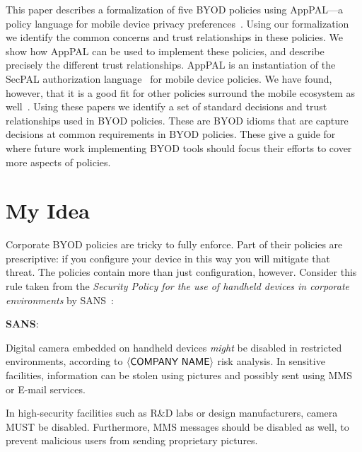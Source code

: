 \documentclass{easychair}
\newenvironment{policyrule}[1]{%
  \begin{mdframed}\footnotesize
      \noindent\textbf{\sffamily #1}:~\itshape%
}{%
  \end{mdframed}
}
\begin{document}
This paper describes a formalization of five BYOD policies using AppPAL---a policy language for mobile device privacy preferences~\cite{hallett_apppal_2016}.
Using our formalization we identify the common concerns and trust relationships in these policies.
We show how AppPAL can be used to implement these policies, and describe precisely the different trust relationships.
AppPAL is an instantiation of the SecPAL authorization language~\cite{becker_secpal:_2010} for mobile device policies.
We have found, however, that it is a good fit for other policies surround the mobile ecosystem as well~\cite{hallett_specifying_2016}.
Using these papers we identify a set of standard decisions and trust relationships used in BYOD policies.
These are BYOD idioms that are capture decisions at common requirements in BYOD policies.
These give a guide for where future work implementing BYOD tools should focus their efforts to cover more aspects of policies.

\section{My Idea}
\label{sec:idea}

Corporate BYOD policies are tricky to fully enforce.
Part of their policies are prescriptive:  if you configure your device in this way you will mitigate that threat.
The policies contain more than just configuration, however.
Consider this rule taken from the \emph{Security Policy for the use of handheld devices in corporate environments} by SANS~\cite{nicholas_r._c._guerin_security_2008}:

\newcommand{\textbra}[1]{\ensuremath{\left\langle \text{\sffamily #1} \right\rangle}}
\begin{policyrule}{SANS}
  Digital camera embedded on handheld devices \emph{might} be disabled in restricted environments, according to \textbra{COMPANY NAME} risk analysis.
  In sensitive facilities, information can be stolen using pictures and possibly sent using MMS or E-mail services.

  In high-security facilities such as R\&D labs or design manufacturers, camera MUST be disabled.
  Furthermore, MMS messages should be disabled as well, to prevent malicious users from sending proprietary pictures.
\end{policyrule}
\end{document}
